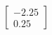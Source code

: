 \documentclass[preview]{standalone}
\begin{document}
\begin{align*}
\begin{bmatrix} -2.25 \\ 0.25 \end{bmatrix}
\end{align*}
\end{document}
